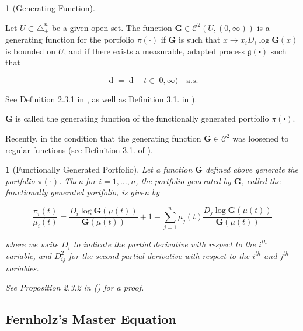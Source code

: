 \documentclass[british]{amsart}
\numberwithin{equation}{section}
\numberwithin{figure}{section}
\theoremstyle{plain}
\theoremstyle{definition}
\newtheorem{defn}[thm]{\protect\definitionname}
\theoremstyle{plain}
\theoremstyle{plain}
\theoremstyle{plain}
\newtheorem{prop}[thm]{\protect\propositionname}
\theoremstyle{remark}
\theoremstyle{plain}
\providecommand{\definitionname}{Definition}
\providecommand{\propositionname}{Proposition}
\renewcommand{\d}[1]{\mathop{\mathrm{d}{#1}}}
\newcommand{\ranget}{t\in[0,\infty)}
\newcommand{\almostsurely}{\text{a.s.}}
\begin{document}
\begin{defn} [Generating Function] \label{def:generatingfunction}

  Let $U\subset\triangle_{+}^{n}$ be a given open set. The function
$\mathbf{G}\in\mathcal{C}^{2}(U,(0,\infty))$ is a generating function for the
portfolio $\pi(\cdot)$ if $\mathbf{G}$ is such that $x\to
x_{i}D_{i}\log\mathbf{G}(x)$ is bounded on $U$, and if there exists a
measurable, adapted process $\mathfrak{g}(\centerdot)$ such that 

  \begin{equation} \d{ \log \left( \frac{V^{\pi}(t)}{V^{\mu}(t)} \right) } = \d{
\log \mathbf{G}(\mu(t)) + \mathfrak{g}(t) } \quad \ranget \quad \almostsurely
\end{equation}

See Definition 2.3.1 in \cite{vervuurt2015}, as well as Definition 3.1. in
\cite{karatzas1998}). 

$\mathbf{G}$ is called the generating function of the functionally generated
portfolio $\pi(\centerdot)$.

\end{defn}

Recently, in \cite{karatzas2017} the condition that the generating function
$\mathbf{G}\in\mathcal{C}^{2}$ was loosened to regular functions (see Definition
3.1. of \cite{karatzas2017}).

\begin{prop} [Functionally Generated Portfolio] \label{prop:FGP} Let a function
$\mathbf{G}$ defined above generate the portfolio $\pi(\cdot)$. Then for
$i=1,\dots,n$, the portfolio generated by $\mathbf{G}$, called the functionally
generated portfolio, is given by

  \begin{equation} \frac{\pi_{i}(t)}{\mu_{i}(t)} =
\frac{D_{i}\log\mathbf{G}(\mu(t))}{\mathbf{G}(\mu(t))}+1 - \sum_{j=1}^{n}
\mu_{j}(t) \frac{D_{j} \log \mathbf{G}(\mu(t))}{\mathbf{G}(\mu(t))}
\end{equation}

where we write $D_{i}$ to indicate the partial derivative with respect to the
$i^{th}$ variable, and $D_{ij}^{2}$ for the second partial derivative with
respect to the $i^{th}$ and $j^{th}$ variables. 

  See Proposition 2.3.2 in (\cite{vervuurt2015}) for a proof. \end{prop}

\newpage

\subsection{Fernholz's Master Equation}
\end{document}
